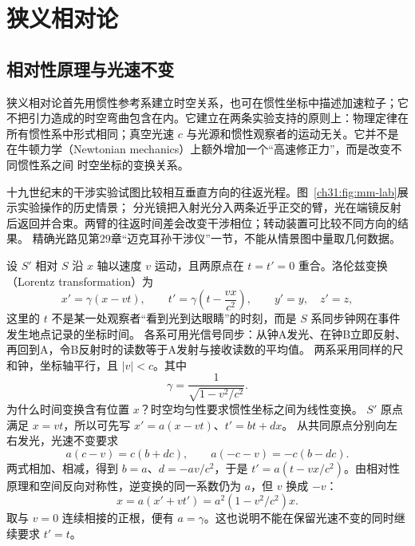 \begingroup
\hypersetup{bookmarksdepth=3}
\newcommand{\ModernAnswerLabel}{{\bfseries\color{DeepBlue}解答}}
\chapter{狭义相对论}

\section{相对性原理与光速不变}

狭义相对论首先用惯性参考系建立时空关系，也可在惯性坐标中描述加速粒子；它不把引力造成的时空弯曲包含在内。它建立在两条实验支持的原则上：物理定律在所有惯性系中形式相同；真空光速
$c$ 与光源和惯性观察者的运动无关。它并不是在牛顿力学（Newtonian mechanics）上额外增加一个“高速修正力”，而是改变不同惯性系之间
时空坐标的变换关系。

十九世纪末的干涉实验试图比较相互垂直方向的往返光程。图~\ref{ch31:fig:mm-lab}展示实验操作的历史情景；
分光镜把入射光分入两条近乎正交的臂，光在端镜反射后返回并合束。两臂的往返时间差会改变干涉相位；转动装置可比较不同方向的结果。
精确光路见第29章“迈克耳孙干涉仪”一节，不能从情景图中量取几何数据。

设 $S'$ 相对 $S$ 沿 $x$ 轴以速度 $v$ 运动，且两原点在 $t=t'=0$ 重合。洛伦兹变换（Lorentz transformation）为
\begin{equation}
 x'=\gamma(x-vt),\qquad
 t'=\gamma\left(t-\frac{vx}{c^2}\right),
 \qquad y'=y,\quad z'=z,
\end{equation}
这里的 $t$ 不是某一处观察者“看到光到达眼睛”的时刻，而是 $S$ 系同步钟网在事件发生地点记录的坐标时间。
各系可用光信号同步：从钟A发光、在钟B立即反射、再回到A，令B反射时的读数等于A发射与接收读数的平均值。
两系采用同样的尺和钟，坐标轴平行，且 $|v|<c$。其中
\begin{equation}
 \gamma=\frac1{\sqrt{1-v^2/c^2}}.
\end{equation}
为什么时间变换含有位置 $x$？时空均匀性要求惯性坐标之间为线性变换。
$S'$ 原点满足 $x=vt$，所以可先写 $x'=a(x-vt)$、$t'=bt+dx$。
从共同原点分别向左右发光，光速不变要求
\[
 a(c-v)=c(b+dc),\qquad a(-c-v)=-c(b-dc).
\]
两式相加、相减，得到 $b=a$、$d=-av/c^2$，于是
$t'=a(t-vx/c^2)$。由相对性原理和空间反向对称性，逆变换的同一系数仍为 $a$，但 $v$ 换成 $-v$：
\[
 x=a(x'+vt')=a^2(1-v^2/c^2)x.
\]
取与 $v=0$ 连续相接的正根，便有 $a=\gamma$。这也说明不能在保留光速不变的同时继续要求 $t'=t$。

